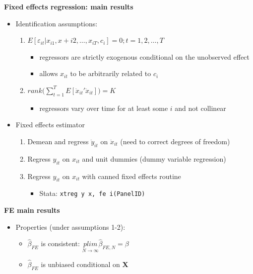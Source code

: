 \documentclass{beamer}
\begin{document}
\begin{frame}[plain]
	\begin{center}
	\textbf{Fixed effects regression: main results}
	\end{center}
	
	\begin{itemize}
	\item Identification assumptions:	
		\begin{enumerate}
		\item $E[\varepsilon_{it} | x_{i1}, x+{i2}, \dots, x_{iT}, c_i]=0; t=1,2,\dots,T$
			\begin{itemize}
			\item regressors are strictly exogenous conditional on the unobserved effect
			\item allows $x_{it}$ to be arbitrarily related to $c_i$
			\end{itemize}
		\item $rank\bigg( \sum_{t=1}^T E[\ddot{x}_{it}'\ddot{x}_{it}]\bigg) = K$
			\begin{itemize}
			\item regressors vary over time for at least some $i$ and not collinear
			\end{itemize}
		\end{enumerate}
	\item Fixed effects estimator
		\begin{enumerate}
		\item Demean and regress $\ddot{y}_{it}$ on $\ddot{x}_{it}$ (need to correct degrees of freedom)
		\item Regress $y_{it}$ on $x_{it}$ and unit dummies (dummy variable regression)
		\item Regress $y_{it}$ on $x_{it}$ with canned fixed effects routine
			\begin{itemize}
			\item Stata: \texttt{xtreg y x, fe i(PanelID)}
			\end{itemize}
		\end{enumerate}
	\end{itemize}
\end{frame}


\begin{frame}[plain]
\begin{center}
\textbf{FE main results}
\end{center}

\begin{itemize}
	\item Properties (under assumptions 1-2):
		\begin{itemize}
		\item $\widehat{\beta}_{FE}$ is consistent: $\underset{N\rightarrow \infty}{plim} \widehat{\beta}_{FE,N}=\beta$
		\item $\widehat{\beta}_{FE}$ is unbiased conditional on \textbf{X}
		\end{itemize}
\end{itemize}

\end{frame}
\end{document}
